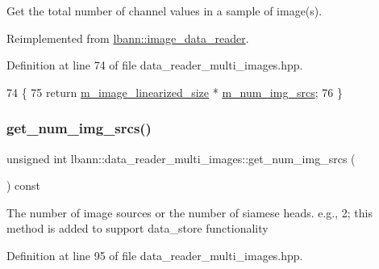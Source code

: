 Get the total number of channel values in a sample of image(s). 



Reimplemented from \hyperlink{classlbann_1_1image__data__reader_a26b8566e76ba99c017a84c49a9dec37c}{lbann\+::image\+\_\+data\+\_\+reader}.



Definition at line 74 of file data\+\_\+reader\+\_\+multi\+\_\+images.\+hpp.


\begin{DoxyCode}
74                                                 \{
75     \textcolor{keywordflow}{return} \hyperlink{classlbann_1_1image__data__reader_af512f1f866c0f654309b7f28886dca9a}{m\_image\_linearized\_size} * \hyperlink{classlbann_1_1data__reader__multi__images_a70752a5442e99333fec52def9eadc58f}{m\_num\_img\_srcs};
76   \}
\end{DoxyCode}
\mbox{\label{classlbann_1_1data__reader__multi__images_a692a657d00afc38dde1dabeb66b1550f}} 
\subsubsection{\texorpdfstring{get\+\_\+num\+\_\+img\+\_\+srcs()}{get\_num\_img\_srcs()}}
{\footnotesize\ttfamily unsigned int lbann\+::data\+\_\+reader\+\_\+multi\+\_\+images\+::get\+\_\+num\+\_\+img\+\_\+srcs (\begin{DoxyParamCaption}{ }\end{DoxyParamCaption}) const\hspace{0.3cm}{\ttfamily [inline]}}

The number of image sources or the number of siamese heads. e.\+g., 2; this method is added to support data\+\_\+store functionality 

Definition at line 95 of file data\+\_\+reader\+\_\+multi\+\_\+images.\+hpp.


